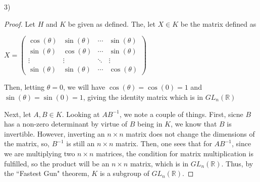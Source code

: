 \documentclass[executivepaper]{article}
\begin{document}
\begin{flushleft}

3)

\begin{center}

\begin{proof}

Let $H$ and $K$ be given as defined. The, let $X \in K$ be the matrix defined as

\begin{center}
 
 $X=\begin{pmatrix}
  \cos(\theta) & \sin(\theta) & \cdots & \sin(\theta) \\
  \sin(\theta) & \cos(\theta) & \cdots & \sin(\theta) \\
  \vdots  & \vdots  & \ddots & \vdots  \\
  \sin(\theta) & \sin(\theta) & \cdots & \cos(\theta) 
 \end{pmatrix}
 $
\end{center}

Then, letting $\theta=0$, we will have $\cos(\theta)=\cos(0)=1$ and $\sin(\theta)=\sin(0)=1$, giving the identity matrix which is in $GL_{n}(\mathbb{R})$

\vspace{5mm}

Next, let $A,B \in K$. Looking at $AB^{-1}$, we note a couple of things. First, sicne $B$ has a non-zero determinant by virtue of $B$ being in $K$, we know that $B$ is invertible. However, inverting an $n \times n$ matrix does not change the dimensions of the matrix, so, $B^{-1}$ is still an $n \times n$ matrix. Then, one sees that for $AB^{-1}$, since we are multiplying two $n \times n$ matrices, the condition for matrix multiplication is fulfilled, so the product will be an $n \times n$ matrix, which is in $GL_{n}(\mathbb{R})$. Thus, by the ``Fastest Gun" theorem, $K$ is a subgroup of $GL_{n}(\mathbb{R})$.

\end{proof}

\end{center}

\end{flushleft}
\end{document}
